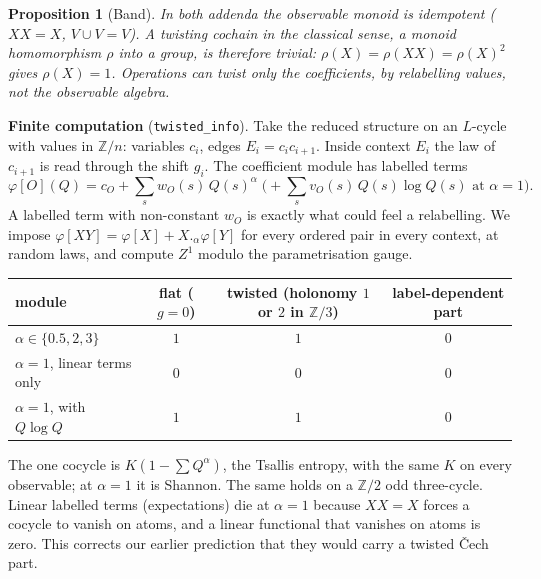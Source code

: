 \documentclass[11pt]{article}
\newtheorem{proposition}[theorem]{Proposition}
\theoremstyle{definition}
\theoremstyle{remark}
\newcommand{\Z}{\mathbb{Z}}
\begin{document}
\begin{proposition}[Band]\label{prop:band}
In both addenda the observable monoid is idempotent ($XX=X$, $V\cup V=V$). A twisting cochain in the classical sense, a monoid homomorphism $\rho$ into a group, is therefore trivial: $\rho(X)=\rho(XX)=\rho(X)^2$ gives $\rho(X)=1$. Operations can twist only the \emph{coefficients}, by relabelling values, not the observable algebra.
\end{proposition}

\textbf{Finite computation} (\texttt{twisted\_info}). Take the reduced structure on an $L$-cycle with values in $\Z/n$: variables $c_i$, edges $E_i=c_ic_{i+1}$. Inside context $E_i$ the law of $c_{i+1}$ is read through the shift $g_i$. The coefficient module has labelled terms
\[
\varphi[O](Q)=c_O+\sum_s w_O(s)\,Q(s)^\alpha\;\bigl(+\textstyle\sum_s v_O(s)\,Q(s)\log Q(s)\text{ at }\alpha=1\bigr).
\]
A labelled term with non-constant $w_O$ is exactly what could feel a relabelling. We impose $\varphi[XY]=\varphi[X]+X._\alpha\varphi[Y]$ for every ordered pair in every context, at random laws, and compute $Z^1$ modulo the parametrisation gauge.

\begin{center}\small
\begin{tabular}{lccc}
\hline
module & flat ($g=0$) & twisted (holonomy $1$ or $2$ in $\Z/3$) & label-dependent part\\
\hline
$\alpha\in\{0.5,2,3\}$ & $1$ & $1$ & $0$\\
$\alpha=1$, linear terms only & $0$ & $0$ & $0$\\
$\alpha=1$, with $Q\log Q$ & $1$ & $1$ & $0$\\
\hline
\end{tabular}
\end{center}

The one cocycle is $K(1-\sum Q^\alpha)$, the Tsallis entropy, with the same $K$ on every observable; at $\alpha=1$ it is Shannon. The same holds on a $\Z/2$ odd three-cycle. Linear labelled terms (expectations) die at $\alpha=1$ because $XX=X$ forces a cocycle to vanish on atoms, and a linear functional that vanishes on atoms is zero. This corrects our earlier prediction that they would carry a twisted \v{C}ech part.
\end{document}
